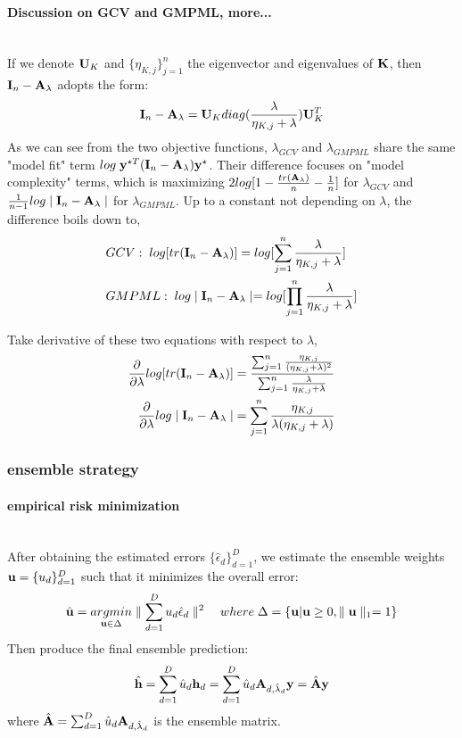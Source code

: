 \documentclass[11pt]{article}
\begin{document}
\vspace{2em}
\paragraph{Discussion on GCV and GMPML, more...}\mbox{}\\
If we denote ${\bf U}_K$ and $\{\eta_{K,j}\}_{j=1}^n$ the eigenvector and eigenvalues of ${\bf K}$, then ${\bf I}_n-{\bf A}_\lambda$ adopts the form:
\begin{align*}
{\bf I}_n-{\bf A}_\lambda={\bf U}_K diag(\frac{\lambda}{\eta_{K,j}+\lambda}){\bf U}_K^T
\end{align*}
As we can see from the two objective functions, $\lambda_{GCV}$ and $\lambda_{GMPML}$ share the same "model fit" term $log\; {\bf y}^{\star T}({\bf I}_n-{\bf A}_\lambda){\bf y}^\star$. Their difference focuses on "model complexity" terms, which is maximizing $2log[1-\frac{tr({\bf A}_\lambda)}{n}-\frac{1}{n}]$ for $\lambda_{GCV}$ and $\frac{1}{n-1}log \mid {\bf I}_n-{\bf A}_\lambda \mid$ for $\lambda_{GMPML}$. Up to a constant not depending on $\lambda$, the difference boils down to,
\begin{align}
&GCV: \; log[tr({\bf I}_n-{\bf A}_\lambda)]=log[\sum_{j=1}^n\frac{\lambda}{\eta_{K,j}+\lambda}]\\
&GMPML: \; log\mid {\bf I}_n-{\bf A}_\lambda\mid=log[\prod_{j=1}^n\frac{\lambda}{\eta_{K,j}+\lambda}]
\end{align}

Take derivative of these two equations with respect to $\lambda$,
\begin{align*}
\frac{\partial }{\partial \lambda}log[tr({\bf I}_n-{\bf A}_\lambda)]&=\frac{\sum_{j=1}^n\frac{\eta_{K,j}}{(\eta_{K,j}+\lambda)^2}}{\sum_{j=1}^n\frac{\lambda}{\eta_{K,j}+\lambda}}\\
\frac{\partial }{\partial \lambda}log\mid {\bf I}_n-{\bf A}_\lambda\mid&=\sum_{j=1}^n\frac{\eta_{K,j}}{\lambda(\eta_{K,j}+\lambda)}
\end{align*}


\subsubsection{{ensemble strategy}}

\paragraph{empirical risk minimization}\mbox{}\\
After obtaining the estimated errors $\{\hat{\epsilon}_d\}_{d=1}^D$, we estimate the ensemble weights ${\bf u}=\{u_d\}_{d=1}^D$ such that it minimizes the overall error:
\begin{align*}
\hat{{\bf u}}=\underset{{\bf u} \in \Delta}{argmin}\parallel \sum_{d=1}^Du_d\hat{\epsilon}_d\parallel^2 \quad where\; \Delta=\{{\bf u} | {\bf u} \geq 0, \parallel {\bf u} \parallel_1=1\}
\end{align*}
Then produce the final ensemble prediction:
\begin{align*}
\hat{{\bf h}}=\sum_{d=1}^D \hat{u}_d {\bf h}_d=\sum_{d=1}^D \hat{u}_d {\bf A}_{d,\hat{\lambda}_d}{\bf y}=\hat{{\bf A}}{\bf y}
\end{align*}
where $\hat{{\bf A}}=\sum_{d=1}^D \hat{u}_d {\bf A}_{d,\hat{\lambda}_d}$ is the ensemble matrix.
\end{document}

